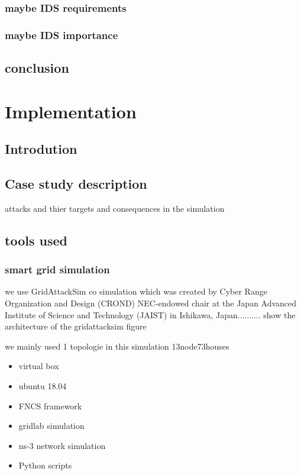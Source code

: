 \subsection{maybe IDS requirements}

\subsection{maybe IDS importance}


\section{conclusion}













\chapter{Implementation} \label{chap:Implementation}
\section{Introdution}



\section{Case study description}
attacks and thier targets and consequences in the simulation



\section{tools used}

\subsection{smart grid simulation}
we use GridAttackSim co simulation which was created by Cyber Range Organization and Design (CROND) NEC-endowed chair at the Japan Advanced Institute of Science and Technology (JAIST) in Ishikawa, Japan..........
show the architecture of the gridattacksim figure

we mainly used 1 topologie in this simulation 13node73houses
\firmlist
\begin{itemize}
	\item virtual box
	\item ubuntu 18.04
	\item FNCS framework
	\item gridlab simulation
	\item ns-3 network simulation
	\item Python scripts
\end{itemize}

